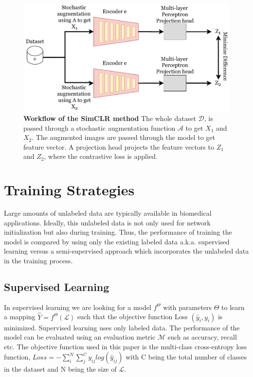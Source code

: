 \begin{figure}[htbp]
\centering
\captionsetup{format=plain}
\includegraphics[keepaspectratio,width=\textwidth]{figures/fig_simclr.pdf}
\caption[Workflow of the SimCLR method]{\textbf{Workflow of the SimCLR method} The whole dataset $\mathcal{D}$, is passed through a stochastic augmentation function $\mathcal{A}$ to get $X_1$ and $X_2$. The augmented images are passed through the model to get feature vector. A projection head projects the feature vectors to $Z_1$ and $Z_2$, where the contrastive loss is applied.}
\label{fig:simclr}
\end{figure}

\newpage

\section{Training Strategies}\label{section:training_strategies}
Large amounts of unlabeled data are typically available in biomedical applications. Ideally, this unlabeled data is not only used for network initialization but also during training. Thus, the performance of training the model is compared by using only the existing labeled data a.k.a. supervised learning versus a semi-supervised approach which incorporates the unlabeled data in the training process.

\subsection{Supervised Learning}
In supervised learning we are looking for a model $f^\Theta$ with parameters $\Theta$ to learn a mapping $\hat{Y} = f^\Theta(\mathcal{L})$ such that the objective function Loss $(\hat{y}_i, y_i)$ is minimized. Supervised learning uses only labeled data. The performance of the model can be evaluated using an evaluation metric $\mathcal{M}$ such as accuracy, recall etc. The objective function used in this paper is the multi-class cross-entropy loss function, $Loss = - \sum_{i}^{N} \sum_{j}^{C} y_{ij}log(\hat{y}_{ij})$ with C being the total number of classes in the dataset and N being the size of $\mathcal{L}$.


